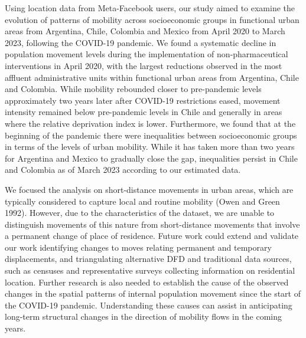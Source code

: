 \documentclass[
  11pt,
]{article}
\begin{document}
Using location data from Meta-Facebook users, our study aimed to examine
the evolution of patterns of mobility across socioeconomic groups in
functional urban areas from Argentina, Chile, Colombia and Mexico from
April 2020 to March 2023, following the COVID-19 pandemic. We found a
systematic decline in population movement levels during the
implementation of non-pharmaceutical interventions in April 2020, with
the largest reductions observed in the most affluent administrative
units within functional urban areas from Argentina, Chile and Colombia.
While mobility rebounded closer to pre-pandemic levels approximately two
years later after COVID-19 restrictions eased, movement intensity
remained below pre-pandemic levels in Chile and generally in areas where
the relative deprivation index is lower. Furthermore, we found that at
the beginning of the pandemic there were inequalities between
socioeconomic groups in terms of the levels of urban mobility. While it
has taken more than two years for Argentina and Mexico to gradually
close the gap, inequalities persist in Chile and Colombia as of March
2023 according to our estimated data.

We focused the analysis on short-distance movements in urban areas,
which are typically considered to capture local and routine mobility
(Owen and Green 1992). However, due to the characteristics of the
dataset, we are unable to distinguish movements of this nature from
short-distance movements that involve a permanent change of place of
residence. Future work could extend and validate our work identifying
changes to moves relating permanent and temporary displacements, and
triangulating alternative DFD and traditional data sources, such as
censuses and representative surveys collecting information on
residential location. Further research is also needed to establish the
cause of the observed changes in the spatial patterns of internal
population movement since the start of the COVID-19 pandemic.
Understanding these causes can assist in anticipating long-term
structural changes in the direction of mobility flows in the coming
years.
\end{document}
